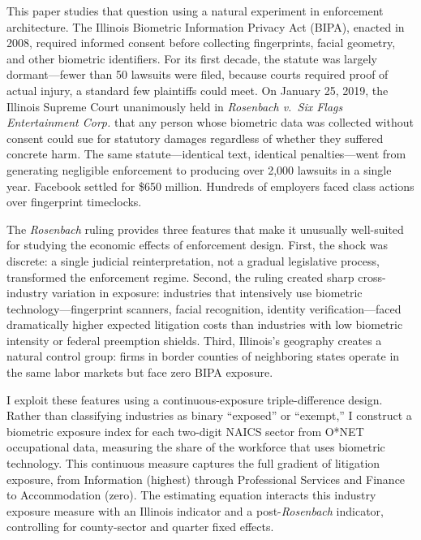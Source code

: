 \documentclass[12pt]{article}
\begin{document}
This paper studies that question using a natural experiment in enforcement architecture. The Illinois Biometric Information Privacy Act (BIPA), enacted in 2008, required informed consent before collecting fingerprints, facial geometry, and other biometric identifiers. For its first decade, the statute was largely dormant---fewer than 50 lawsuits were filed, because courts required proof of actual injury, a standard few plaintiffs could meet. On January 25, 2019, the Illinois Supreme Court unanimously held in \textit{Rosenbach v.\ Six Flags Entertainment Corp.} that any person whose biometric data was collected without consent could sue for statutory damages regardless of whether they suffered concrete harm. The same statute---identical text, identical penalties---went from generating negligible enforcement to producing over 2,000 lawsuits in a single year. Facebook settled for \$650 million. Hundreds of employers faced class actions over fingerprint timeclocks.

The \textit{Rosenbach} ruling provides three features that make it unusually well-suited for studying the economic effects of enforcement design. First, the shock was discrete: a single judicial reinterpretation, not a gradual legislative process, transformed the enforcement regime. Second, the ruling created sharp cross-industry variation in exposure: industries that intensively use biometric technology---fingerprint scanners, facial recognition, identity verification---faced dramatically higher expected litigation costs than industries with low biometric intensity or federal preemption shields. Third, Illinois's geography creates a natural control group: firms in border counties of neighboring states operate in the same labor markets but face zero BIPA exposure.

I exploit these features using a continuous-exposure triple-difference design. Rather than classifying industries as binary ``exposed'' or ``exempt,'' I construct a biometric exposure index for each two-digit NAICS sector from O*NET occupational data, measuring the share of the workforce that uses biometric technology. This continuous measure captures the full gradient of litigation exposure, from Information (highest) through Professional Services and Finance to Accommodation (zero). The estimating equation interacts this industry exposure measure with an Illinois indicator and a post-\textit{Rosenbach} indicator, controlling for county-sector and quarter fixed effects.
\end{document}
